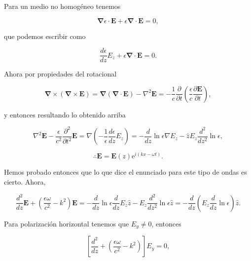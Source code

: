 \documentclass[a4paper,11pt]{article}
\numberwithin{equation}{section}
\newcommand{\euler}{\mathrm{e}}
\begin{document}
Para un medio no homogéneo tenemos 

\begin{equation}
 \pmb{\nabla} \epsilon \cdot \mathbf{E} + \epsilon \pmb{\nabla} \cdot \mathbf{E} = 
 0,
\end{equation}

que podemos escribir como 

\begin{equation}
 \frac{d \epsilon}{d z} E_z + \epsilon \pmb{\nabla} \cdot \mathbf{E} = 0.
\end{equation}

Ahora por propiedades del rotacional 

\begin{equation}
 \pmb{\nabla} \times ( \pmb{\nabla} \times \mathbf{E}) = 
 \pmb{\nabla} (\pmb{\nabla} \cdot \mathbf{E}) - \nabla^2 \mathbf{E} = 
 - \frac{1}{c} \frac{\partial}{\partial t} \left(\frac{\epsilon}{c} 
 \frac{\partial \mathbf{E}}{\partial t}\right),
\end{equation}

y entonces resultando lo obtenido arriba

\begin{equation}
 \nabla^2 \mathbf{E} - \frac{\epsilon}{c^2} \frac{\partial^2}{\partial t^2} \mathbf{E} = 
 \nabla \left(- \frac{1}{\epsilon} \frac{d\epsilon}{dz} E_z \right) = 
 - \frac{d}{dz} \ln{\epsilon} \nabla E_z - \hat{z} E_z \frac{d^2}{dz^2} \ln{\epsilon} ,
\end{equation}

\begin{equation}
 \therefore \mathbf{E} = \mathbf{E}(z) \euler^{i(kx - \omega t)}.
\end{equation}

Hemos probado entonces que lo que dice el enunciado para este tipo de ondas es cierto. 
Ahora, 

\begin{equation}
 \frac{d^2}{dz} \mathbf{E} + \left(\frac{\epsilon \omega}{c^2} - k^2 \right)\mathbf{E} = 
 - \frac{d}{dz} \ln{\epsilon} \frac{d}{dz} E_z \hat{z} - E_z \frac{d^2}{dz^2}
 \ln{\epsilon} \hat{z} = - \frac{d}{dz}\left(E_z \frac{d}{dz} \ln{\epsilon} \right) 
 \hat{z}.
\end{equation}

Para polarización horizontal tenemos que $E_y \ne 0$, entonces 

\begin{equation}
 \left[ \frac{d^2}{dz}  + \left(\frac{\epsilon \omega}{c^2} - k^2 \right)\right] E_y 
 = 0,
\end{equation}
\end{document}
